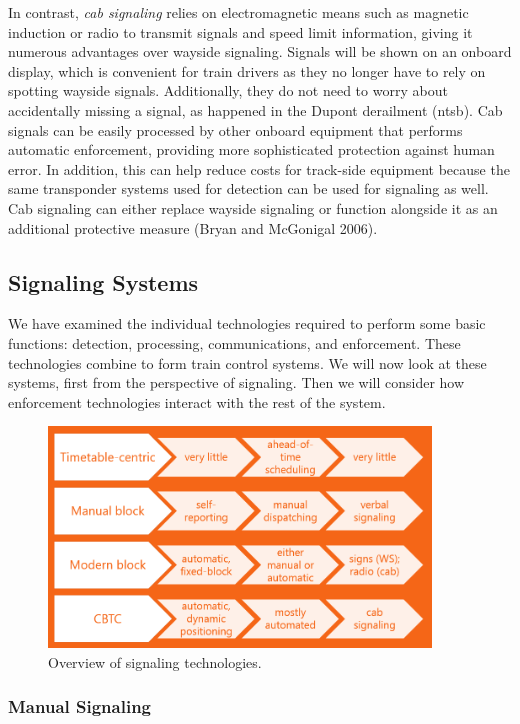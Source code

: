 \documentclass[11pt, titlepage]{article}
\begin{document}
In contrast, \textit{cab signaling} relies on electromagnetic means such as
magnetic induction or radio to transmit signals and speed limit information, giving
it numerous advantages over wayside signaling. Signals will be shown on an onboard
display, which is convenient for train drivers as they no longer have to rely on
spotting wayside signals. Additionally, they do not need to worry about
accidentally missing a signal, as happened in the Dupont derailment (ntsb). Cab
signals can be easily processed by other onboard equipment that performs automatic
enforcement, providing more sophisticated protection against human error. In
addition, this can help reduce costs for track-side equipment because the same
transponder systems used for detection can be used for signaling as well. Cab
signaling can either replace wayside signaling or function alongside it as an
additional protective measure (Bryan and McGonigal 2006).

\subsection{Signaling Systems}

We have examined the individual technologies required to perform some basic
functions: detection, processing, communications, and enforcement. These
technologies combine to form train control systems. We will now look at these
systems, first from the perspective of signaling. Then we will consider how
enforcement technologies interact with the rest of the system.

\begin{figure}[ht]
    \begin{center}
        \includegraphics[width=4in]{SignalingTechnologies.png}
        \caption{Overview of signaling technologies.}
    \end{center}
\end{figure}

\subsubsection{Manual Signaling}
\end{document}
